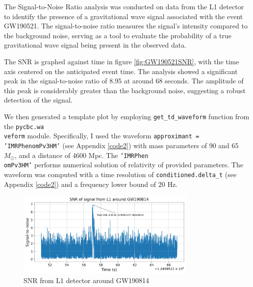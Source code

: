 The Signal-to-Noise Ratio analysis was conducted on data from the L1 detector to identify the presence of a gravitational wave signal associated with the event GW190521. The signal-to-noise ratio measures the signal's intensity compared to the background noise, serving as a tool to evaluate the probability of a true gravitational wave signal being present in the observed data.

The SNR is graphed against time in figure \ref{fig:GW190521SNR}, with the time axis centered on the anticipated event time. The analysis showed a significant peak in the signal-to-noise ratio of 8.95 at around 68 seconds. The amplitude of this peak is considerably greater than the background noise, suggesting a robust detection of the signal.


We then generated a template plot by employing \texttt{get\_td\_waveform} function from the \texttt{pycbc.wa\\veform} module. Specifically, I used the waveform \texttt{approximant = 'IMRPhenomPv3HM'} (see Appendix \ref{code2}) with mass parameters of 90 and 65 $M_\odot$, and a distance of 4600 Mpc. The \texttt{'IMRPhen\\omPv3HM'} performs numerical solution of relativity of provided parameters. The waveform was computed with a time resolution of \texttt{conditioned.delta\_t} (see Appendix \ref{code2}) and a frequency lower bound of 20 Hz.
\begin{figure}[h]
            \centering          
            \includegraphics[width=0.78\textwidth]{GWanalysisProject_codefile/SNRplot/SNRL1GW190814.png}
            \caption{SNR from L1 detector around GW190814}
            \label{fig:GW190814SNR}
\end{figure}

